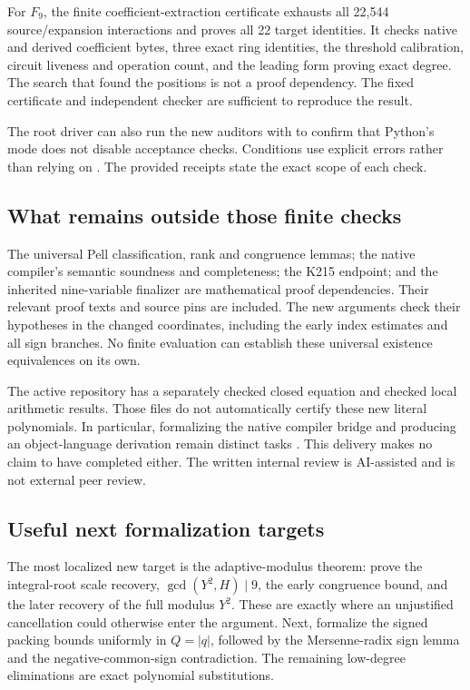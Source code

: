 \documentclass[11pt,a4paper]{article}
\theoremstyle{definition}
\theoremstyle{remark}
\begin{document}
For $F_9$, the finite coefficient-extraction certificate exhausts all
22,544 source/expansion interactions and proves all 22 target identities.
It checks native and derived coefficient bytes, three exact ring identities,
the threshold calibration, circuit liveness and operation count, and the
leading form proving exact degree.  The search that found the positions
is not a proof dependency.  The fixed certificate and independent checker
are sufficient to reproduce the result.

The root driver can also run the new auditors with  to
confirm that Python's  mode does not disable acceptance checks.
Conditions use explicit errors rather than relying on .
The provided receipts state the exact scope of each check.

\subsection{What remains outside those finite checks}

The universal Pell classification, rank and congruence lemmas; the
native compiler's semantic soundness and completeness; the K215 endpoint;
and the inherited nine-variable finalizer are mathematical proof
dependencies.  Their relevant proof texts and source pins are included.
The new arguments check their hypotheses in the changed coordinates,
including the early index estimates and all sign branches.  No finite
evaluation can establish these universal existence equivalences on its own.

The active repository has a separately checked closed equation and checked
local arithmetic results.  Those files do not automatically certify these
new literal polynomials.  In particular, formalizing the native compiler
bridge and producing an object-language derivation remain distinct tasks
\cite{active}.  This delivery makes no claim to have completed either.
The written internal review is AI-assisted and is not external peer review.

\subsection{Useful next formalization targets}

The most localized new target is the adaptive-modulus theorem: prove the
integral-root scale recovery, $\gcd(Y^2,H)\mid9$, the early congruence bound,
and the later recovery of the full modulus $Y^2$.  These are exactly where
an unjustified cancellation could otherwise enter the argument.  Next,
formalize the signed packing bounds uniformly in $Q=|q|$, followed by the
Mersenne-radix sign lemma and the negative-common-sign contradiction.  The
remaining low-degree eliminations are exact polynomial substitutions.
\end{document}
